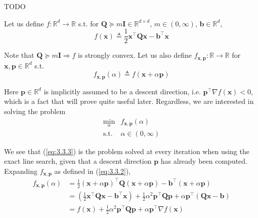 \documentclass{article}
\begin{document}
\medskip

TODO


Let us define $ f : \mathbb{R}^d \rightarrow \mathbb{R} $ s.t. for
$ \mathbf{Q} \succeq m\mathbf{I} \in \mathbb{R}^{d \times d} $,
$ m \in (0, \infty) $, $ \mathbf{b} \in \mathbb{R}^d $,
\begin{equation} \label{eq:3.3.1}
    f(\mathbf{x}) \triangleq
    \frac{1}{2}\mathbf{x}^\top\mathbf{Qx} - \mathbf{b}^\top\mathbf{x}
\end{equation}

Note that $ \mathbf{Q} \succeq m\mathbf{I} \Rightarrow f $ is strongly convex.
Let us also define
$ f_{\mathbf{x}, \mathbf{p}} : \mathbb{R} \rightarrow \mathbb{R} $ for
$ \mathbf{x}, \mathbf{p} \in \mathbb{R}^d $ s.t.
\begin{equation} \label{eq:3.3.2}
    f_{\mathbf{x}, \mathbf{p}}(\alpha) \triangleq
    f(\mathbf{x} + \alpha\mathbf{p})
\end{equation}

Here $ \mathbf{p} \in \mathbb{R}^d $ is implicitly assumed to be a descent
direction, i.e. $ \mathbf{p}^\top\nabla f(\mathbf{x}) < 0 $, which is a fact
that will prove quite useful later. Regardless, we are interested in solving
the problem
\begin{equation} \label{eq:3.3.3}
    \begin{array}{ll}
        \displaystyle\min_\alpha & f_{\mathbf{x}, \mathbf{p}}(\alpha) \\
        \text{s.t.} & \alpha \in (0, \infty)
    \end{array}
\end{equation}

We see that (\ref{eq:3.3.3}) is the problem solved at every iteration when
using the exact line search, given that a descent direction $ \mathbf{p} $ has
already been computed. Expanding $ f_{\mathbf{x}, \mathbf{p}} $ as defined in
(\ref{eq:3.3.2}),
\begin{equation} \label{eq:3.3.4}
    \begin{split}
        f_{\mathbf{x}, \mathbf{p}}(\alpha) & =
        \frac{1}{2}(\mathbf{x} +
        \alpha\mathbf{p})^\top\mathbf{Q}(\mathbf{x} + \alpha\mathbf{p}) -
        \mathbf{b}^\top(\mathbf{x} + \alpha\mathbf{p}) \\
        & =
        \left(
            \frac{1}{2}\mathbf{x}^\top\mathbf{Q}\mathbf{x} -
            \mathbf{b}^\top\mathbf{x}
        \right) +
        \frac{1}{2}\alpha^2\mathbf{p}^\top\mathbf{Qp} +
        \alpha\mathbf{p}^\top(\mathbf{Qx} - \mathbf{b}) \\
        & =
        f(\mathbf{x}) + \frac{1}{2}\alpha^2\mathbf{p}^\top\mathbf{Qp} +
        \alpha\mathbf{p}^\top\nabla f(\mathbf{x})
    \end{split}
\end{equation}
\end{document}
